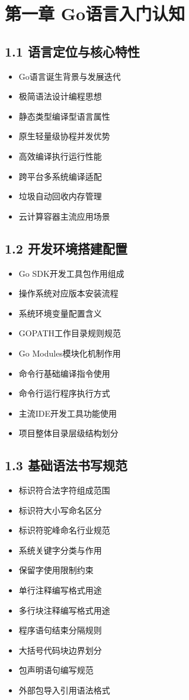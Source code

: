 
\section{第一章 Go语言入门认知}
\subsection{1.1 语言定位与核心特性}
\begin{itemize}
\item Go语言诞生背景与发展迭代
\item 极简语法设计编程思想
\item 静态类型编译型语言属性
\item 原生轻量级协程并发优势
\item 高效编译执行运行性能
\item 跨平台多系统编译适配
\item 垃圾自动回收内存管理
\item 云计算容器主流应用场景
\end{itemize}

\subsection{1.2 开发环境搭建配置}
\begin{itemize}
\item Go SDK开发工具包作用组成
\item 操作系统对应版本安装流程
\item 系统环境变量配置含义
\item GOPATH工作目录规则规范
\item Go Modules模块化机制作用
\item 命令行基础编译指令使用
\item 命令行运行程序执行方式
\item 主流IDE开发工具功能使用
\item 项目整体目录层级结构划分
\end{itemize}

\subsection{1.3 基础语法书写规范}
\begin{itemize}
\item 标识符合法字符组成范围
\item 标识符大小写命名区分
\item 标识符驼峰命名行业规范
\item 系统关键字分类与作用
\item 保留字使用限制约束
\item 单行注释编写格式用途
\item 多行块注释编写格式用途
\item 程序语句结束分隔规则
\item 大括号代码块边界划分
\item 包声明语句编写规范
\item 外部包导入引用语法格式
\end{itemize}

